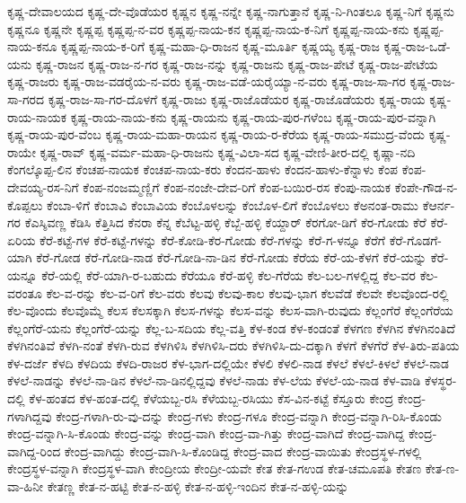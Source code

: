 {ಕೃಷ್ಣ-ದೇವಾಲಯದ
ಕೃಷ್ಣ-ದೇ-ವೊಡೆಯರ
ಕೃಷ್ಣನ
ಕೃಷ್ಣ-ನನ್ನೇ
ಕೃಷ್ಣ-ನಾಗುತ್ತಾನೆ
ಕೃಷ್ಣ-ನಿ-ಗಿಂತಲೂ
ಕೃಷ್ಣ-ನಿಗೆ
ಕೃಷ್ಣನು
ಕೃಷ್ಣನೂ
ಕೃಷ್ಣನೇ
ಕೃಷ್ಣಪ್ಪ
ಕೃಷ್ಣಪ್ಪ-ನ-ವರ
ಕೃಷ್ಣಪ್ಪ-ನಾಯ-ಕನ
ಕೃಷ್ಣಪ್ಪ-ನಾಯ-ಕ-ನಿಗೆ
ಕೃಷ್ಣಪ್ಪ-ನಾಯ-ಕನು
ಕೃಷ್ಣಪ್ಪ-ನಾಯ-ಕನೂ
ಕೃಷ್ಣಪ್ಪ-ನಾಯ-ಕ-ರಿಗೆ
ಕೃಷ್ಣ-ಮಹಾ-ಧಿ-ರಾಜನ
ಕೃಷ್ಣ-ಮೂರ್ತಿ
ಕೃಷ್ಣಯ್ಯ
ಕೃಷ್ಣ-ರಾಜ
ಕೃಷ್ಣ-ರಾಜ-ಒಡೆ-ಯನು
ಕೃಷ್ಣ-ರಾಜನ
ಕೃಷ್ಣ-ರಾಜ-ನ-ಗರ
ಕೃಷ್ಣ-ರಾಜ-ನನ್ನು
ಕೃಷ್ಣ-ರಾಜನು
ಕೃಷ್ಣ-ರಾಜ-ಪೇಟೆ
ಕೃಷ್ಣ-ರಾಜ-ಪೇಟೆಯ
ಕೃಷ್ಣ-ರಾಜರು
ಕೃಷ್ಣ-ರಾಜ-ವಡರೈಯ-ನ-ವರು
ಕೃಷ್ಣ-ರಾಜ-ವಡೆ-ಯರೈಯ್ಯಾ-ನ-ವರು
ಕೃಷ್ಣ-ರಾಜ-ಸಾ-ಗರ
ಕೃಷ್ಣ-ರಾಜ-ಸಾ-ಗರದ
ಕೃಷ್ಣ-ರಾಜ-ಸಾ-ಗರ-ದೊಳಗೆ
ಕೃಷ್ಣ-ರಾಜು
ಕೃಷ್ಣ-ರಾಜೊಡೆಯರ
ಕೃಷ್ಣ-ರಾಜೊಡೆಯರು
ಕೃಷ್ಣ-ರಾಯ
ಕೃಷ್ಣ-ರಾಯ-ನಾಯಕ
ಕೃಷ್ಣ-ರಾಯ-ನಾಯ-ಕನು
ಕೃಷ್ಣ-ರಾಯನು
ಕೃಷ್ಣ-ರಾಯ-ಪುರ-ಗಳೆಂಬ
ಕೃಷ್ಣ-ರಾಯ-ಪುರ-ವನ್ನಾಗಿ
ಕೃಷ್ಣ-ರಾಯ-ಪುರ-ವೆಂಬ
ಕೃಷ್ಣ-ರಾಯ-ಮಹಾ-ರಾಯನ
ಕೃಷ್ಣ-ರಾಯ-ರ-ಕೆರೆಯ
ಕೃಷ್ಣ-ರಾಯ-ಸಮುದ್ರ-ವೆಂದು
ಕೃಷ್ಣ-ರಾಯೇ
ಕೃಷ್ಣ-ರಾವ್
ಕೃಷ್ಣ-ವರ್ಮ-ಮಹಾ-ಧಿ-ರಾಜನು
ಕೃಷ್ಣ-ವಿಲಾ-ಸದ
ಕೃಷ್ಣ-ವೇಣಿ-ತೀರ-ದಲ್ಲಿ
ಕೃಷ್ಣಾ-ನದಿ
ಕೆಂಗಲ್ಕೊಪ್ಪ-ಲಿನ
ಕೆಂಚಪ-ನಾಯಕ
ಕೆಂಚಪ-ನಾಯ-ಕರು
ಕೆಂದನ-ಹಾಳು
ಕೆಂದನ-ಹಾಳು-ಕೆನ್ನಾಳು
ಕೆಂಪ
ಕೆಂಪ-ದೇವಯ್ಯ-ರಸ-ನಿಗೆ
ಕೆಂಪ-ನಂಜಮ್ಮಣ್ಣಿಗೆ
ಕೆಂಪ-ನಂಜೇ-ದೇವ-ರಿಗೆ
ಕೆಂಪ-ಬಯಿರ-ರಸ
ಕೆಂಪು-ನಾಯಕ
ಕೆಂಪೇ-ಗೌಡ-ನ-ಕೊಪ್ಪಲು
ಕೆಂಬಾ-ಳಿಗೆ
ಕೆಂಬಾವಿ
ಕೆಂಬಾವಿಯ
ಕೆಂಬೊಳಲನ್ನು
ಕೆಂಬೊಳ-ಲಿಗೆ
ಕೆಂಬೊಳಲು
ಕೆಅನಂತ-ರಾಮು
ಕೆಆರ್ನ-ಗರ
ಕೆಎಸ್ಶಿವಣ್ಣ
ಕೆಡಿಸಿ
ಕೆತ್ತಿಸಿದ
ಕೆನರಾ
ಕೆನ್ನ
ಕೆಬೆಟ್ಟ-ಹಳ್ಳಿ
ಕೆಬ್ಬೆ-ಹಳ್ಳಿ
ಕೆಯ್ದಾರ್
ಕೆರಗೋ-ಡಿಗೆ
ಕೆರ-ಗೋಡು
ಕೆರೆ
ಕೆರೆ-ಏರಿಯ
ಕೆರೆ-ಕಟ್ಟೆ-ಗಳ
ಕೆರೆ-ಕಟ್ಟೆ-ಗಳನ್ನು
ಕೆರೆ-ಕೋಡಿ-ಕೆರ-ಗೋಡು
ಕೆರೆ-ಗಳನ್ನು
ಕೆರೆ-ಗ-ಳನ್ನೂ
ಕೆರೆಗೆ
ಕೆರೆ-ಗೊಡಗೆ-ಯಾಗಿ
ಕೆರೆ-ಗೋಡ
ಕೆರೆ-ಗೋಡಿ-ನಾಡ
ಕೆರೆ-ಗೋಡಿ-ನಾ-ಡಿನ
ಕೆರೆ-ಗೋಡು
ಕೆರೆಯ
ಕೆರೆ-ಯ-ಕೆಳಗೆ
ಕೆರೆ-ಯನ್ನು
ಕೆರೆ-ಯನ್ನೂ
ಕೆರೆ-ಯಲ್ಲಿ
ಕೆರೆ-ಯಾಗಿ-ರ-ಬಹುದು
ಕೆರೆಯೂ
ಕೆರೆ-ಹಳ್ಳಿ
ಕೆಲ-ಗೆರೆಯ
ಕೆಲ-ಬಲ-ಗಳಲ್ಲಿದ್ದ
ಕೆಲ-ವರ
ಕೆಲ-ವರಂತೂ
ಕೆಲ-ವ-ರನ್ನು
ಕೆಲ-ವ-ರಿಗೆ
ಕೆಲ-ವರು
ಕೆಲವು
ಕೆಲವು-ಕಾಲ
ಕೆಲವು-ಭಾಗ
ಕೆಲವೆಡೆ
ಕೆಲವೇ
ಕೆಲವೊಂದ-ರಲ್ಲಿ
ಕೆಲ-ವೊಂದು
ಕೆಲವೊಮ್ಮೆ
ಕೆಲಸ
ಕೆಲಸಕ್ಕಾಗಿ
ಕೆಲಸ-ಗಳನ್ನು
ಕೆಲಸ-ವನ್ನು
ಕೆಲಸ-ವಾಗಿ-ರುವುದು
ಕೆಲ್ಲಂಗೆರೆ
ಕೆಲ್ಲಂಗೆರೆಯ
ಕೆಲ್ಲಂಗೆರೆ-ಯನು
ಕೆಲ್ಲಂಗೆರೆ-ಯನ್ನು
ಕೆಲ್ಲ-ಬ-ಸದಿಯ
ಕೆಲ್ಲ-ವತ್ತಿ
ಕೆಳ-ಕಂಡ
ಕೆಳ-ಕಂಡಂತೆ
ಕೆಳಗಣ
ಕೆಳಗಿನ
ಕೆಳಗಿನಂತಿದೆ
ಕೆಳಗಿನಂತಿವೆ
ಕೆಳಗಿ-ನಂತೆ
ಕೆಳಗಿ-ರುವ
ಕೆಳಗಿಳಿಸಿ
ಕೆಳಗಿಳಿಸಿ-ದರು
ಕೆಳಗಿಳಿಸಿ-ದು-ದಕ್ಕಾಗಿ
ಕೆಳಗೆ
ಕೆಳಗೆರೆ
ಕೆಳ-ತಿರು-ಪತಿಯ
ಕೆಳ-ದರ್ಜೆ
ಕೆಳದಿ
ಕೆಳದಿಯ
ಕೆಳದಿ-ರಾಜರ
ಕೆಳ-ಭಾಗ-ದಲ್ಲಿಯೇ
ಕೆಳಲಿ
ಕೆಳಲಿ-ನಾಡ
ಕೆಳಲೆ
ಕೆಳಲೆ-ಕಿಳಲೆ
ಕೆಳಲೆ-ನಾಡ
ಕೆಳಲೆ-ನಾಡನ್ನು
ಕೆಳಲೆ-ನಾ-ಡಿನ
ಕೆಳಲೆ-ನಾ-ಡಿನಲ್ಲಿದ್ದವು
ಕೆಳಲೆ-ನಾಡು
ಕೆಳ-ಲೆಯ
ಕೆಳಲೆ-ಯ-ನಾಡ
ಕೆಳ-ವಾಡಿ
ಕೆಳಸ್ಥರ-ದಲ್ಲಿ
ಕೆಳ-ಹಂತದ
ಕೆಳ-ಹಂತ-ದಲ್ಲಿ
ಕೆಳೆಯಬ್ಬ-ರಸಿ
ಕೆಳೆಯಬ್ಬ-ರಸಿಯು
ಕೆಸ-ವಿನ-ಕಟ್ಟೆ
ಕೆಸ್ತೂರು
ಕೇಂದ್ರ
ಕೇಂದ್ರ-ಗಳಾಗಿದ್ದವು
ಕೇಂದ್ರ-ಗಳಾಗಿ-ರು-ವು-ದನ್ನು
ಕೇಂದ್ರ-ಗಳು
ಕೇಂದ್ರ-ಗಳೂ
ಕೇಂದ್ರ-ವನ್ನಾಗಿ
ಕೇಂದ್ರ-ವನ್ನಾಗಿ-ರಿಸಿ-ಕೊಂಡು
ಕೇಂದ್ರ-ವನ್ನಾಗಿ-ಸಿ-ಕೊಂಡು
ಕೇಂದ್ರ-ವನ್ನು
ಕೇಂದ್ರ-ವಾಗಿ
ಕೇಂದ್ರ-ವಾ-ಗಿತ್ತು
ಕೇಂದ್ರ-ವಾಗಿದೆ
ಕೇಂದ್ರ-ವಾಗಿದ್ದ
ಕೇಂದ್ರ-ವಾಗಿದ್ದ-ರಿಂದ
ಕೇಂದ್ರ-ವಾಗಿದ್ದು
ಕೇಂದ್ರ-ವಾಗಿ-ಸಿ-ಕೊಂಡಿದ್ದ
ಕೇಂದ್ರ-ವಾದ
ಕೇಂದ್ರ-ವಾಯಿತು
ಕೇಂದ್ರಸ್ಥಳ-ಗಳಲ್ಲಿ
ಕೇಂದ್ರಸ್ಥಳ-ವನ್ನಾಗಿ
ಕೇಂದ್ರಸ್ಥಳ-ವಾಗಿ
ಕೇಂದ್ರೀಯ
ಕೇಂದ್ರೀ-ಯವೇ
ಕೇತ
ಕೇತ-ಗಉಡ
ಕೇತ-ಚಮೂಪತಿ
ಕೇತಣ
ಕೇತ-ಣ-ವಾ-ಹಿನೀ
ಕೇತಣ್ಣ
ಕೇತ-ನ-ಹಟ್ಟಿ
ಕೇತ-ನ-ಹಳ್ಳಿ
ಕೇತ-ನ-ಹಳ್ಳಿ-ಇಂದಿನ
ಕೇತ-ನ-ಹಳ್ಳಿ-ಯನ್ನು
}

